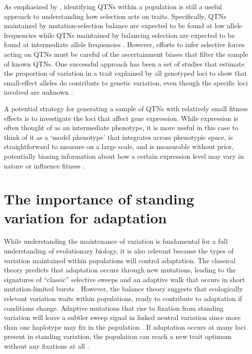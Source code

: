 As emphasized by \citep{Lee2014-pi}, identifying QTNs within a population is still a useful approach to understanding how selection acts on traits. Specifically, QTNs maintained by mutation-selection balance are expected to be found at low allele frequencies while QTNs maintained by balancing selection are expected to be found at intermediate allele frequencies \citep{Barton2002-do}. However, efforts to infer selective forces acting on QTNs must be careful of the ascertainment biases that filter the sample of known QTNs. One successful approach has been a set of studies that estimate the proportion of variation in a trait explained by all genotyped loci to show that small-effect alleles do contribute to genetic variation, even though the specific loci involved are unknown \citep{Yang2010-iu,International_Schizophrenia_Consortium2009-ks}.

A potential strategy for generating a sample of QTNs with relatively small fitness effects is to investigate the loci that affect gene expression. While expression is often thought of as an intermediate phenotype, it is more useful in this case to think of it as a ‘model phenotype’ that integrates across phenotypic space, is straightforward to measure on a large scale, and is measurable without prior, potentially biasing information about how a certain expression level may vary in nature or influence fitness \citep{Rockman2006-yx}.

\section{The importance of standing variation for adaptation}

While understanding the maintenance of variation is fundamental for a full understanding of evolutionary biology, it is also relevant because the types of variation maintained within populations will control adaptation. The classical theory predicts that adaptation occurs through new mutations, leading to the signatures of “classic” selective sweeps and an adaptive walk that occurs in short mutation-limited bursts \citep{Smith1974,Allen_Orr2005-fs,Fisher1930-el}. However, the balance theory suggests that ecologically relevant variation waits within populations, ready to contribute to adaptation if conditions change. Adaptive mutations that rise to fixation from standing variation will leave a subtler sweep signal in linked neutral variation since more than one haplotype may fix in the population \citep{pennings2006_2,pennings2006_3,hermisson2005}. If adaptation occurs at many loci present in standing variation, the population can reach a new trait optimum without any fixations at all \citep{Pritchard2010-uh,Pritchard2010-uq}.

